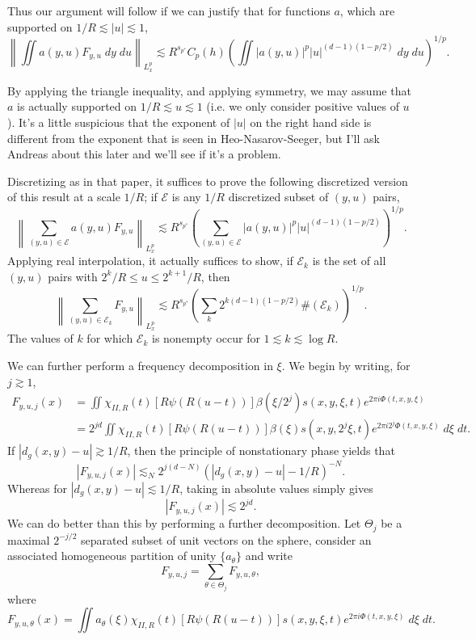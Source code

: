 Thus our argument will follow if we can justify that for functions $a$, which are supported on $1/R \lesssim |u| \lesssim 1$,
%
\[ \left\| \iint a(y,u) F_{y,u}\; dy\; du \right\|_{L^p_x} \lesssim R^{s_{p^*}} C_p(h) \left( \iint |a(y,u)|^p |u|^{(d-1)(1 - p/2)}\; dy\; du \right)^{1/p}. \]
%

By applying the triangle inequality, and applying symmetry, we may assume that $a$ is actually supported on $1/R \lesssim u \lesssim 1$ (i.e. we only consider positive values of $u$). It's a little suspicious that the exponent of $|u|$ on the right hand side is different from the exponent that is seen in Heo-Nasarov-Seeger, but I'll ask Andreas about this later and we'll see if it's a problem.

Discretizing as in that paper, it suffices to prove the following discretized version of this result at a scale $1/R$; if $\mathcal{E}$ is any $1/R$ discretized subset of $(y,u)$ pairs,
%
\[ \left\| \sum_{(y,u) \in \mathcal{E}} a(y,u) F_{y,u} \right\|_{L^p_x} \lesssim R^{s_{p^*}} \left( \sum_{(y,u) \in \mathcal{E}} |a(y,u)|^p |u|^{(d-1)(1 - p/2)} \right)^{1/p}. \]
%
Applying real interpolation, it actually suffices to show, if $\mathcal{E}_k$ is the set of all $(y,u)$ pairs with $2^k / R \leq u \leq 2^{k+1} / R$, then
%
\[ \left\| \sum_{(y,u) \in \mathcal{E}_k} F_{y,u} \right\|_{L^p_x} \lesssim R^{s_{p^*}} \left( \sum_k 2^{k(d-1)(1 - p/2)} \#(\mathcal{E}_k) \right)^{1/p}. \]
%
The values of $k$ for which $\mathcal{E}_k$ is nonempty occur for $1 \lesssim k \lesssim \log R$.

We can further perform a frequency decomposition in $\xi$. We begin by writing, for $j \gtrsim 1$,
%
\begin{align*}
    F_{y,u,j}(x) &= \iint \chi_{II,R}(t) [R \psi(R(u - t))] \beta(\xi / 2^j) s(x,y,\xi,t) e^{2 \pi i \Phi(t,x,y,\xi)}\\
    &= 2^{jd} \iint \chi_{II,R}(t) [R \psi(R(u - t))] \beta(\xi) s(x,y,2^j \xi,t) e^{2 \pi i 2^j \Phi(t,x,y,\xi)}\; d\xi\; dt.
\end{align*}
%
If $|d_g(x,y) - u| \gtrsim 1/R$, then the principle of nonstationary phase yields that
%
\[ |F_{y,u,j}(x)| \lesssim_N 2^{j(d-N)} (|d_g(x,y) - u| - 1/R)^{-N}. \]
%
Whereas for $|d_g(x,y) - u| \lesssim 1/R$, taking in absolute values simply gives
%
\[ |F_{y,u,j}(x)| \lesssim 2^{jd}. \]
%
We can do better than this by performing a further decomposition. Let $\Theta_j$ be a maximal $2^{-j/2}$ separated subset of unit vectors on the sphere, consider an associated homogeneous partition of unity $\{ a_\theta \}$ and write
%
\[ F_{y,u,j} = \sum_{\theta \in \Theta_j} F_{y,u,\theta}, \]
%
where
%
\[ F_{y,u,\theta}(x) = \iint a_\theta(\xi) \chi_{II,R}(t) [R \psi(R(u - t))] s(x,y,\xi,t) e^{2 \pi i \Phi(t,x,y,\xi)} \; d\xi\; dt. \]
%


